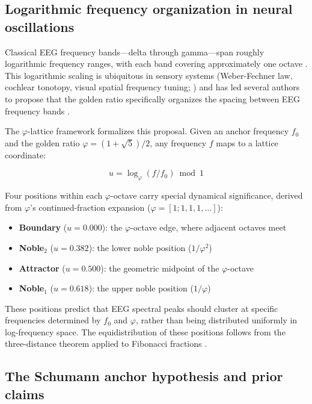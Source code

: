 \documentclass[11pt,a4paper]{article}
\newcommand{\phisym}{\varphi}
\newcommand{\fzero}{f_0}
\begin{document}
\subsection{Logarithmic frequency organization in neural oscillations}

Classical EEG frequency bands---delta through gamma---span roughly logarithmic frequency ranges, with each band covering approximately one octave \parencite{Buzsaki2004, Penttonen2003}. This logarithmic scaling is ubiquitous in sensory systems (Weber-Fechner law, cochlear tonotopy, visual spatial frequency tuning; \cite{Buzsaki2006}) and has led several authors to propose that the golden ratio specifically organizes the spacing between EEG frequency bands \parencite{Roopun2008, Pletzer2010, Klimesch2012, Kramer2022}.

The $\phisym$-lattice framework formalizes this proposal. Given an anchor frequency $\fzero$ and the golden ratio $\phisym = (1+\sqrt{5})/2$, any frequency $f$ maps to a lattice coordinate:
\begin{keyequation}
\begin{equation}
u = \log_\phisym(f / \fzero) \bmod 1
\end{equation}
\end{keyequation}
\noindent Four positions within each $\phisym$-octave carry special dynamical significance, derived from $\phisym$'s continued-fraction expansion ($\phisym = [1; 1, 1, 1, \ldots]$):
\begin{itemize}
    \item \textbf{Boundary} ($u = 0.000$): the $\phisym$-octave edge, where adjacent octaves meet
    \item \textbf{Noble$_2$} ($u = 0.382$): the lower noble position ($1/\phisym^2$)
    \item \textbf{Attractor} ($u = 0.500$): the geometric midpoint of the $\phisym$-octave
    \item \textbf{Noble$_1$} ($u = 0.618$): the upper noble position ($1/\phisym$)
\end{itemize}
These positions predict that EEG spectral peaks should cluster at specific frequencies determined by $\fzero$ and $\phisym$, rather than being distributed uniformly in log-frequency space. The equidistribution of these positions follows from the three-distance theorem applied to Fibonacci fractions \parencite{Slater1967}.

\subsection{The Schumann anchor hypothesis and prior claims}
\end{document}
